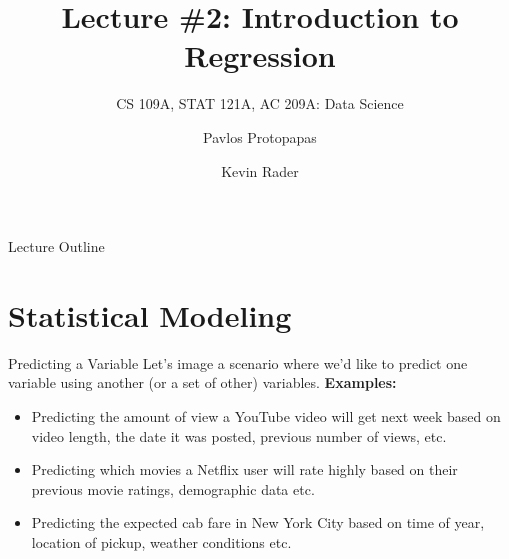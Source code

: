 \documentclass[12pt,t]{beamer}
\begin{document}

\title{\large{Lecture \#2: Introduction to Regression}}
\subtitle{CS 109A, STAT 121A, AC 209A: Data Science}
\author{Pavlos Protopapas \and Kevin Rader}
\date{}
{
\frame{
  \titlepage
  
}
}


\begin{frame}{Lecture Outline}
\tableofcontents
\end{frame}

\section{Statistical Modeling}

\begin{frame}{Predicting a Variable} 
Let's image a scenario where we'd like to predict one variable using another (or a set of other) variables.
\vskip0.2cm
\textbf{Examples:}
\begin{itemize}
\setlength{\itemsep}{0.4cm}
\item Predicting the amount of view a YouTube video will get next week based on video length, the date it was posted, previous number of views, etc.
\item Predicting which movies a Netflix user will rate highly based on their previous movie ratings, demographic data etc.
\item Predicting the expected cab fare in New York City based on time of year, location of pickup, weather conditions etc.
\end{itemize}
\end{frame}
\end{document}
